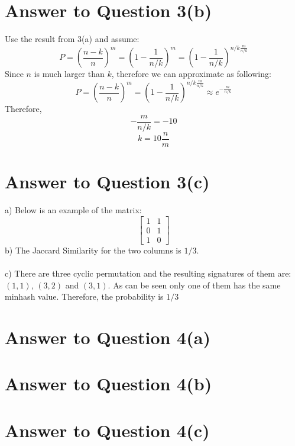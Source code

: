 \documentclass[11pt]{article}
\begin{document}
\section*{Answer to Question 3(b)}
Use the result from 3(a) and assume:
\begin{equation*}
    P = (\frac{n-k}{n})^m = (1 - \frac{1}{n/k})^m = (1 - \frac{1}{n/k})^{n/k\frac{m}{n/k}}
\end{equation*}
Since $n$ is much larger than $k$, therefore we can approximate as following:
\begin{equation*}
    P = (\frac{n-k}{n})^m = (1 - \frac{1}{n/k})^{n/k\frac{m}{n/k}} \approx e^{-\frac{m}{n/k}}
\end{equation*}
Therefore,
\begin{equation*}
    -\frac{m}{n/k} = -10
\end{equation*}
\begin{equation}
    k = 10\frac{n}{m}
\end{equation}

\pagebreak[4]
\section*{Answer to Question 3(c)}
a) Below is an example of the matrix:
\begin{equation*}
\begin{bmatrix}
    1 & 1\\
    0 & 1\\
    1 & 0
\end{bmatrix}
\end{equation*}
b) The Jaccard Similarity for the two columns is $1/3$.\\
\\
c) There are three cyclic permutation and the resulting signatures of them are:
$(1, 1)$, $(3, 2)$ and $(3, 1)$. As can be seen only one of them has the same minhash value.
Therefore, the probability is $1/3$

\pagebreak[4]
\section*{Answer to Question 4(a)}

\pagebreak[4]
\section*{Answer to Question 4(b)}

\pagebreak[4]
\section*{Answer to Question 4(c)}
\end{document}
